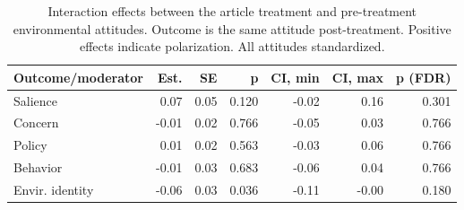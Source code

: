 \begin{table}[h!t]
\centering
\begin{tabular}{lrrrrrr}
  \hline
Outcome/moderator & Est. & SE & p & CI, min & CI, max & p (FDR) \\ 
  \hline
Salience & 0.07 & 0.05 & 0.120 & -0.02 & 0.16 & 0.301 \\ 
  Concern & -0.01 & 0.02 & 0.766 & -0.05 & 0.03 & 0.766 \\ 
  Policy & 0.01 & 0.02 & 0.563 & -0.03 & 0.06 & 0.766 \\ 
  Behavior & -0.01 & 0.03 & 0.683 & -0.06 & 0.04 & 0.766 \\ 
  Envir. identity & -0.06 & 0.03 & 0.036 & -0.11 & -0.00 & 0.180 \\ 
   \hline
\end{tabular}
\caption{Interaction effects between the article treatment and pre-treatment environmental attitudes.
                   Outcome is the same attitude post-treatment. Positive effects indicate polarization. All attitudes
                   standardized.} 
\label{tab:main_polarize}
\end{table}
